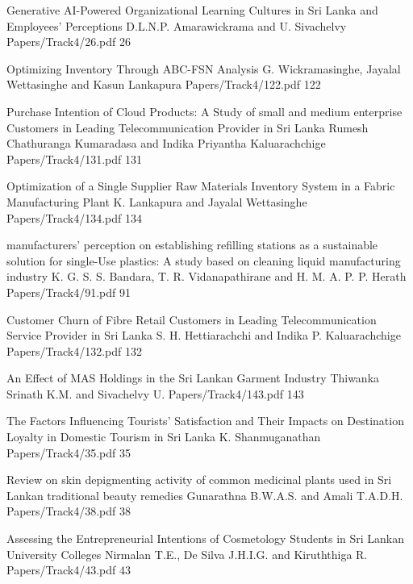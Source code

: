 




\addpaper
{Generative AI-Powered Organizational Learning Cultures in Sri Lanka and Employees' Perceptions}
{D.L.N.P. Amarawickrama and U. Sivachelvy}
{Papers/Track4/26.pdf}
{26}

\addpaper
{Optimizing Inventory Through ABC-FSN Analysis}
{G. Wickramasinghe, Jayalal Wettasinghe and Kasun Lankapura}
{Papers/Track4/122.pdf}
{122}

   \addpaper
{Purchase Intention of Cloud Products: A Study of small and medium enterprise Customers in Leading Telecommunication Provider in Sri Lanka}
 {Rumesh Chathuranga Kumaradasa and Indika Priyantha Kaluarachchige } 
 {Papers/Track4/131.pdf}
   {131}

\addpaper
{Optimization of a Single Supplier Raw Materials Inventory System in a Fabric Manufacturing Plant}
{K. Lankapura and Jayalal Wettasinghe}
{Papers/Track4/134.pdf}
{134}

   \addpaper
{manufacturers' perception on establishing
refilling stations as a sustainable solution for
single-Use plastics: A study based on cleaning
liquid manufacturing industry}
 {K. G. S. S. Bandara, T. R. Vidanapathirane and H. M. A. P. P. Herath} 
 {Papers/Track4/91.pdf}
   {91}


   \addpaper
{Customer Churn of Fibre Retail Customers in Leading Telecommunication Service Provider in Sri Lanka}
 {S. H. Hettiarachchi and Indika P. Kaluarachchige} 
 {Papers/Track4/132.pdf}
   {132}


   
   

\addpaper
{An Effect of MAS Holdings in the Sri Lankan Garment Industry}
{Thiwanka Srinath K.M. and Sivachelvy U.}
{Papers/Track4/143.pdf}
{143}


\addpaper
{The Factors Influencing Tourists’ Satisfaction and Their Impacts on Destination Loyalty in Domestic Tourism in Sri Lanka}
{K. Shanmuganathan}
{Papers/Track4/35.pdf}
{35}



   \addpaper
{Review on skin depigmenting activity of common medicinal plants used in Sri Lankan traditional beauty remedies}
 {Gunarathna B.W.A.S. and Amali T.A.D.H.} 
 {Papers/Track4/38.pdf}
   {38}



   \addpaper
{Assessing the Entrepreneurial Intentions of Cosmetology Students in Sri Lankan University Colleges}
 {Nirmalan T.E., De Silva J.H.I.G. and Kiruththiga R.} 
 {Papers/Track4/43.pdf}
   {43}





